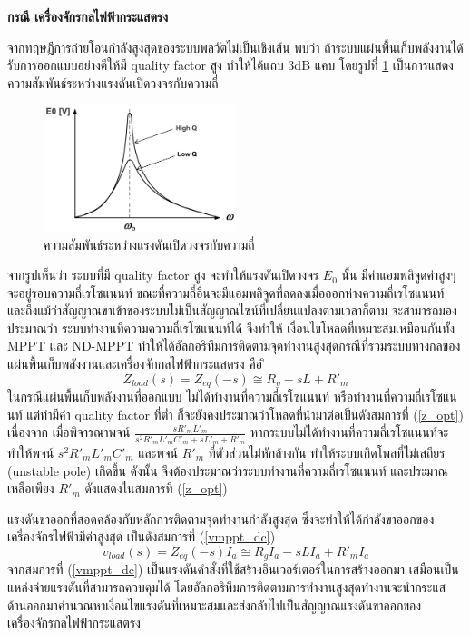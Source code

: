 \documentclass[11pt,a4paper]{article}
\begin{document}
\textbf{กรณี เครื่องจักรกลไฟฟ้ากระแสตรง}

จากทฤษฎีการถ่ายโอนกำลังสูงสุดของระบบพลวัตไม่เป็นเชิงเส้น พบว่า ถ้าระบบแผ่นพื้นเก็บพลังงานได้รับการออกแบบอย่างดีให้มี quality factor สูง ทำให้ได้แถบ 3dB แคบ โดยรูปที่ \ref{Q_factor} เป็นการแสดงความสัมพันธ์ระหว่างแรงดันเปิดวงจรกับความถี่ 
\begin{figure}[H]
    \begin{center}
        \includegraphics[width=0.5\textwidth]{Q_factor.jpeg.jpg}
    \end{center}
    \caption{ความสัมพันธ์ระหว่างแรงดันเปิดวงจรกับความถี่ }
    \label{Q_factor}
\end{figure}
จากรูปเห็นว่า ระบบที่มี quality factor สูง จะทำให้แรงดันเปิดวงจร $E_{0}$ นั้น มีค่าแอมพลิจูดค่าสูงๆจะอยู่รอบความถี่เรโซแนนท์ ขณะที่ความถี่อื่นจะมีแอมพลิจูดที่ลดลงเมื่อออกห่างความถี่เรโซแนนท์ และถึงแม้ว่าสัญญาณขาเข้าของระบบไม่เป็นสัญญาณไซน์ที่เปลี่ยนแปลงตามเวลาก็ตาม จะสามารถมองประมาณว่า ระบบทำงานที่ความความถี่เรโซแนนท์ได้  
จึงทำให้ เงื่อนไขโหลดที่เหมาะสมเหมือนกันทั้ง MPPT และ ND-MPPT ทำให้ได้อัลกอริทึมการติดตามจุดทำงานสูงสุดกรณีที่รวมระบบทางกลของแผ่นพื้นเก็บพลังงานและเครื่องจักกลไฟฟ้ากระแสตรง คือ
ิ\begin{equation} \label{z_opt}
    Z_{load}(s)= Z_{eq} (-s) \cong R_{g} - sL+ R'_{m}  
\end{equation}
ในกรณีแผ่นพื้นเก็บพลังงานที่ออกแบบ ไม่ได้ทำงานที่ความถี่เรโซแนนท์ หรือทำงานที่ความถี่เรโซแนนท์ แต่ทำมีค่า quality factor ที่ต่ำ ก็จะยังคงประมาณว่าโหลดที่นำมาต่อเป็นดังสมการที่ (\ref{z_opt})
เนื่องจาก เมื่อพิจารณาพจน์ $\frac{ sR'_{m}L'_{m} }{ s^2R'_{m}L'_{m}C'_{m} + sL'_{m} + R'_{m}}$ หากระบบไม่ได้ทำงานที่ความถี่เรโซแนนท์จะทำให้พจน์ $s^2R'_{m}L'_{m}C'_{m}$ และพจน์ $R'_{m}$ ที่ตัวส่วนไม่หักล้างกัน
ทำให้ระบบเกิดโพลที่ไม่เสถียร (unstable pole) เกิดขึ้น ดังนั้น จึงต้องประมาณว่าระบบทำงานที่ความถี่เรโซแนนท์ และประมาณเหลือเพียง $R'_{m}$ ดังแสดงในสมการที่ (\ref{z_opt}) 

แรงดันขาออกที่สอดคล้องกับหลักการติดตามจุดทำงานกำลังสูงสุด ซึ่งจะทำให้ได้กำลังขาออกของเครื่องจักรไฟฟ้ามีค่าสูงสุด เป็นดังสมการที่ (\ref{vmppt_dc})
\begin{equation}\label{vmppt_dc}
    v_{load}(s)= Z_{eq}(-s)I_{a} \cong R_{g}I_{a} - sLI_{a} + R'_{m}I_{a} 
\end{equation}
จากสมการที่ (\ref{vmppt_dc}) เป็นแรงดันคำสั่งที่ใช้สร้างอินเวอร์เตอร์ในการสร้างออกมา เสมือนเป็นแหล่งจ่ายแรงดันที่สามารถควบคุมได้ โดยอัลกอริทึมการติดตามการทำงานสูงสุดทำงานจะนำกระแสด้านออกมาคำนวณหาเงื่อนไขแรงดันที่เหมาะสมและส่งกลับไปเป็นสัญญาณแรงดันขาออกของเครื่องจักรกลไฟฟ้ากระแสตรง
\end{document}
